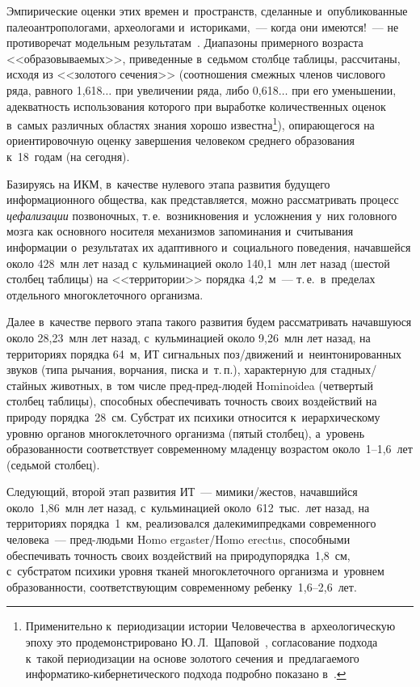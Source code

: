 \begin{multicols}{2}
  Эмпирические оценки этих времен и~пространств, сделанные 
и~опуб\-ли\-ко\-ван\-ные палео\-ант\-ро\-по\-ло\-га\-ми, археологами и~историками,~--- 
когда они имеются!~--- не противоречат модельным  
результатам~\cite{14-grn}.
Диапазоны примерного возраста <<образовываемых>>, приведенные 
в~седьмом столб\-це таб\-ли\-цы, рассчитаны, исходя из <<золотого сечения>> 
(соотношения смеж\-ных членов чис\-ло\-во\-го ряда, равного 1,618$\ldots$ при 
увеличении ряда, либо 0,618$\ldots$ при его уменьшении, аде\-кват\-ность 
использования которого при выработке количественных оценок в~самых 
различных областях знания хорошо известна\footnote{Применительно 
к~периодизации истории Человечества в~археологическую эпоху это продемонстрировано 
Ю.\,Л.~Щаповой~\cite{18-grn, 19-grn, 20-grn}, согласование подхода к~такой периодизации на 
основе золотого сечения и~пред\-ла\-га\-емо\-го информатико-ки\-бер\-не\-ти\-че\-ско\-го подхода 
подробно показано в~\cite{10-grn, 12-grn, 13-grn, 14-grn, 15-grn, 21-grn}.}), 
опирающегося на ориентировочную оценку завершения человеком среднего 
образования к~18~годам (на сегодня).


  Базируясь на ИКМ, в~качестве нулевого этапа развития будущего 
информационного общества, как пред\-став\-ля\-ет\-ся, можно рас\-смат\-ри\-вать 
процесс \textit{цефализации} позвоночных, т.\,е.\ возникновения 
и~усложнения у~них головного мозга как основного носителя механизмов 
запоминания и~считывания информации о~результатах их адаптивного 
и~социального поведения, начавшейся около 428~млн лет назад 
с~кульминацией около 140,1~млн лет назад (шестой стол\-бец таб\-ли\-цы) на 
<<территории>> порядка 4,2~м~--- т.\,е.\ в~пределах отдельного 
многоклеточного организма.
  

  
  Далее в~качестве первого этапа такого развития будем рассматривать 
начавшуюся около 28,23~млн лет назад, с~кульминацией около 9,26~млн лет 
назад, на территориях порядка 64~м, ИТ сигнальных поз/дви\-же\-ний 
и~неинтонированных звуков (типа рычания, ворчания, писка и~т.\,п.), 
характерную для стад\-ных/стай\-ных животных, в~том числе  
пред-пред-людей {Hominoidea} (четвертый стол\-бец таб\-ли\-цы), 
способных обеспечивать точность своих воздействий на природу порядка~28~см. 
Субстрат их психики относится к~иерархическому уровню органов 
многоклеточного организма (пятый стол\-бец), а~уровень об\-ра\-зо\-ван\-ности 
соответствует современному младенцу возрастом около~1--1,6~лет (седьмой 
столбец).
  
  Следующий, второй этап развития ИТ~--- ми\-ми\-ки/жес\-тов, начавшийся 
около~1,86~млн лет назад, с~кульминацией около~612~тыс.\ лет назад, на 
территориях порядка~1~км, реализовался далекими\linebreak предками современного 
человека~--- пред-людь\-ми {Homo ergaster/Homo erectus}, способными 
обеспечивать точ\-ность своих воздействий на природу\linebreak порядка~1,8~см, 
с~субстратом психики уров\-ня тканей многоклеточного организма и~уровнем 
обра\-зо\-ван\-ности, соответствующим современному ребенку~1,6--2,6~лет.

\pagebreak

\end{multicols}

